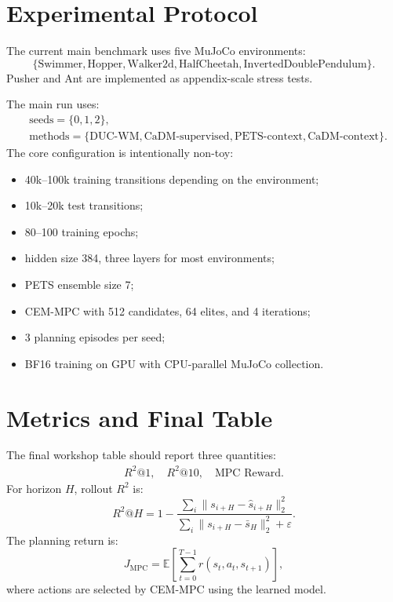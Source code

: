 \documentclass[11pt]{article}
\newcommand{\E}{\mathbb{E}}
\begin{document}
\section{Experimental Protocol}

The current main benchmark uses five MuJoCo environments:
\begin{equation}
    \{\text{Swimmer},\text{Hopper},\text{Walker2d},\text{HalfCheetah},\text{InvertedDoublePendulum}\}.
\end{equation}
Pusher and Ant are implemented as appendix-scale stress tests.

The main run uses:
\begin{align}
    &\text{seeds} = \{0,1,2\}, \\
    &\text{methods} =
    \{\text{DUC-WM},\text{CaDM-supervised},\text{PETS-context},\text{CaDM-context}\}.
\end{align}
The core configuration is intentionally non-toy:
\begin{itemize}[leftmargin=1.5em]
    \item 40k--100k training transitions depending on the environment;
    \item 10k--20k test transitions;
    \item 80--100 training epochs;
    \item hidden size 384, three layers for most environments;
    \item PETS ensemble size 7;
    \item CEM-MPC with 512 candidates, 64 elites, and 4 iterations;
    \item 3 planning episodes per seed;
    \item BF16 training on GPU with CPU-parallel MuJoCo collection.
\end{itemize}

\section{Metrics and Final Table}

The final workshop table should report three quantities:
\begin{align}
    R^2@1,\quad R^2@10,\quad \text{MPC Reward}.
\end{align}
For horizon $H$, rollout $R^2$ is:
\begin{equation}
    R^2@H
    =
    1 -
    \frac{
        \sum_i
        \|s_{i+H}-\hat s_{i+H}\|_2^2
    }{
        \sum_i
        \|s_{i+H}-\bar s_H\|_2^2
        +
        \varepsilon
    }.
\end{equation}
The planning return is:
\begin{equation}
    J_{\mathrm{MPC}}
    =
    \E
    \left[
        \sum_{t=0}^{T-1}
        r(s_t,a_t,s_{t+1})
    \right],
\end{equation}
where actions are selected by CEM-MPC using the learned model.
\end{document}

